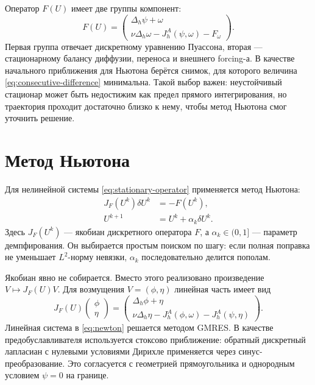 \documentclass[12pt,a4paper]{article}
\newcommand{\Laplace}{\Delta}
\begin{document}
Оператор \(F(U)\) имеет две группы компонент:
\begin{equation}
    F(U)=
    \begin{pmatrix}
    \Laplace_h\psi+\omega\\
    \nu\Laplace_h\omega
    -J_h^A(\psi,\omega)-F_\omega
    \end{pmatrix}.
    \label{eq:discrete-stationary-residual}
\end{equation}
Первая группа отвечает дискретному уравнению Пуассона, вторая --- стационарному балансу диффузии, переноса и внешнего forcing-а.
В качестве начального приближения для Ньютона берётся снимок, для которого величина \eqref{eq:consecutive-difference} минимальна.
Такой выбор важен: неустойчивый стационар может быть недостижим как предел прямого интегрирования, но траектория проходит достаточно близко к нему, чтобы метод Ньютона смог уточнить решение.

\section{Метод Ньютона}

Для нелинейной системы \eqref{eq:stationary-operator} применяется метод Ньютона:
\begin{equation}
\begin{aligned}
    J_F(U^k)\delta U^k&=-F(U^k),\\
    U^{k+1}&=U^k+\alpha_k\delta U^k.
\end{aligned}
\label{eq:newton}
\end{equation}
Здесь \(J_F(U^k)\) --- якобиан дискретного оператора \(F\), а \(\alpha_k\in(0,1]\) --- параметр демпфирования.
Он выбирается простым поиском по шагу: если полная поправка не уменьшает \(L^2\)-норму невязки, \(\alpha_k\) последовательно делится пополам.

Якобиан явно не собирается.
Вместо этого реализовано произведение \(V\mapsto J_F(U)V\).
Для возмущения \(V=(\phi,\eta)\) линейная часть имеет вид
\begin{equation}
    J_F(U)
    \begin{pmatrix}
    \phi\\ \eta
    \end{pmatrix}
    =
    \begin{pmatrix}
    \Laplace_h\phi+\eta\\
    \nu\Laplace_h\eta
    -J_h^A(\phi,\omega)
    -J_h^A(\psi,\eta)
    \end{pmatrix}.
    \label{eq:newton-jv}
\end{equation}
Линейная система в \eqref{eq:newton} решается методом GMRES.
В качестве предобуславливателя используется стоксово приближение: обратный дискретный лапласиан с нулевыми условиями Дирихле применяется через синус-преобразование.
Это согласуется с геометрией прямоугольника и однородным условием \(\psi=0\) на границе.
\end{document}
